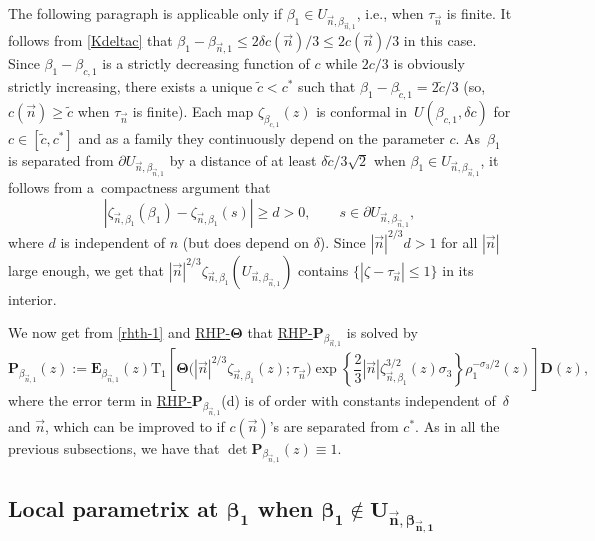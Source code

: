 \documentclass[10pt,a4paper]{amsart}
\numberwithin{equation}{section}
\renewcommand{\det}{\operatorname{det}}
\newcommand{\n}{{\vec n}}
\newcommand{\rhp} {\textnormal{RHP}-${\boldsymbol P}$}
\newcommand{\rhth} {\textnormal{RHP}-${\boldsymbol \Theta}$}
\begin{document}
The following paragraph is applicable only if $ \beta_1 \in U_{\n,\beta_{\n,1}} $, i.e., when $ \tau_\n $ is finite. It follows from \eqref{Kdeltac} that $ \beta_1-\beta_{\n,1}\leq 2\delta c(\n)/3\leq 2c(\n)/3$ in this case. Since $ \beta_1-\beta_{c,1} $ is a strictly decreasing function of $ c $ while $ 2c/3 $ is obviously strictly increasing, there exists a unique $ \tilde c<c^* $ such that $ \beta_1-\beta_{\tilde c,1} = 2\tilde c/3$ (so, $ c(\n)\geq \tilde c $ when $ \tau_\n $ is finite). Each map $ \zeta_{\beta_{c,1}}(z) $ is conformal in~$ U(\beta_{c,1},\delta c) $ for $ c\in[\tilde c,c^*] $ and as a family they continuously depend on the parameter $ c $. As~$ \beta_1 $ is separated from $ \partial U_{\n,\beta_{\n,1}} $ by a distance of at least $ \delta \tilde c/3\sqrt2 $ when $ \beta_1\in U_{\n,\beta_{\n,1}} $, it follows from a~compactness argument that
\[
|\zeta_{\n,\beta_1}(\beta_1)-\zeta_{\n,\beta_1}(s)| \geq d>0, \qquad s\in \partial U_{\n,\beta_{\n,1}},
\]
where $ d $ is independent of $ n $ (but does depend on $ \delta $). Since $ |\n|^{2/3}d>1 $ for all $ |\n| $ large enough, we get that $ |\n|^{2/3}\zeta_{\n,\beta_1}(U_{\n,\beta_{\n,1}} ) $ contains $ \{|\zeta-\tau_\n|\leq 1\} $ in its interior.

We now get from \eqref{rhth-1} and \hyperref[rhth]{\rhth} that \hyperref[rhp]{\rhp$_{\beta_{\n,1}}$} is solved by
\begin{equation}
\label{rhth-2}
\boldsymbol P_{\beta_{\n,1}}(z) := \boldsymbol E_{\beta_{\n,1}}(z) \mathrm{T}_1\left[ \boldsymbol\Theta\bigl(|\n|^{2/3}\zeta_{\n,\beta_1}(z);\tau_\n\bigr) \exp\left\{\frac23|\n|\zeta_{\n,\beta_1}^{3/2}(z)\sigma_3 \right\} \rho_1^{-\sigma_3/2}(z) \right] \boldsymbol D(z),
\end{equation}
where the error term in \hyperref[rhp]{\rhp$_{\beta_{\n,1}}$}(d) is of order  with constants independent of~$ \delta $ and $ \n $, which can be improved to  if $ c(\n) $'s are separated from $ c^* $. As in all the previous subsections, we have that $ \det \boldsymbol P_{\beta_{\n,1}}(z) \equiv 1 $.


\subsection[Local parametrix at beta\_1 when]{Local parametrix at $ \boldsymbol{\beta_1} $ when $\boldsymbol{\beta_1 \notin U_{\n,\beta_{\n,1}} }$}
\end{document}
